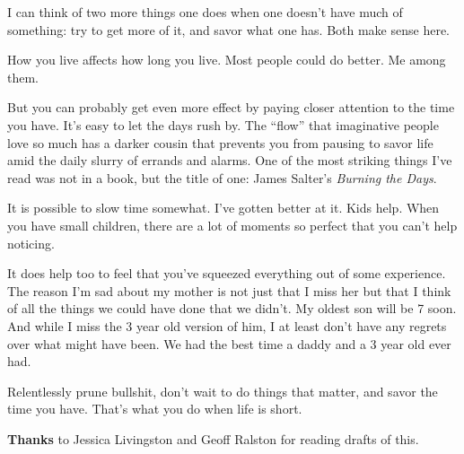 I can think of two more things one does when one doesn't have much of
something: try to get more of it, and savor what one has. Both make
sense here.

How you live affects how long you live. Most people could do better. Me
among them.

But you can probably get even more effect by paying closer attention to
the time you have. It's easy to let the days rush by. The ``flow'' that
imaginative people love so much has a darker cousin that prevents you
from pausing to savor life amid the daily slurry of errands and alarms.
One of the most striking things I've read was not in a book, but the
title of one: James Salter's \emph{Burning the Days}.

It is possible to slow time somewhat. I've gotten better at it. Kids
help. When you have small children, there are a lot of moments so
perfect that you can't help noticing.

It does help too to feel that you've squeezed everything out of some
experience. The reason I'm sad about my mother is not just that I miss
her but that I think of all the things we could have done that we
didn't. My oldest son will be 7 soon. And while I miss the 3 year old
version of him, I at least don't have any regrets over what might have
been. We had the best time a daddy and a 3 year old ever had.

Relentlessly prune bullshit, don't wait to do things that matter, and
savor the time you have. That's what you do when life is short.


\textbf{Thanks} to Jessica Livingston and Geoff Ralston for reading
drafts of this.